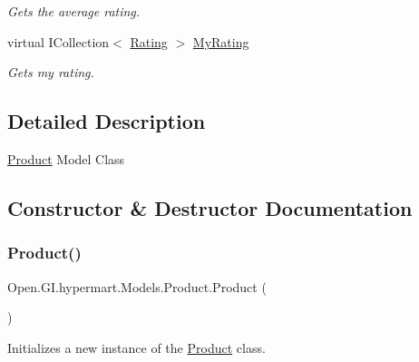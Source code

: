 \begin{DoxyCompactItemize}
\begin{DoxyCompactList}\small\item\em Gets the average rating. \end{DoxyCompactList}\item 
virtual I\+Collection$<$ \hyperlink{class_open_1_1_g_i_1_1hypermart_1_1_models_1_1_rating}{Rating} $>$ \hyperlink{class_open_1_1_g_i_1_1hypermart_1_1_models_1_1_product_ac4dbb116d11b4c02f51d0ce0adf33bf2}{My\+Rating}
\begin{DoxyCompactList}\small\item\em Gets my rating. \end{DoxyCompactList}\end{DoxyCompactItemize}


\subsection{Detailed Description}
\hyperlink{class_open_1_1_g_i_1_1hypermart_1_1_models_1_1_product}{Product} Model Class 



\subsection{Constructor \& Destructor Documentation}
\hypertarget{class_open_1_1_g_i_1_1hypermart_1_1_models_1_1_product_a6e3b824c07f190baa506f9c73da63e62}{}\label{class_open_1_1_g_i_1_1hypermart_1_1_models_1_1_product_a6e3b824c07f190baa506f9c73da63e62} 
\subsubsection{\texorpdfstring{Product()}{Product()}\hspace{0.1cm}{\footnotesize\ttfamily [1/2]}}
{\footnotesize\ttfamily Open.\+G\+I.\+hypermart.\+Models.\+Product.\+Product (\begin{DoxyParamCaption}{ }\end{DoxyParamCaption})}



Initializes a new instance of the \hyperlink{class_open_1_1_g_i_1_1hypermart_1_1_models_1_1_product}{Product} class. 


